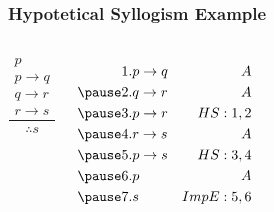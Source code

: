 \documentclass[dvipsnames]{beamer}
\begin{document}
\begin{frame}
  \frametitle{Hypotetical Syllogism Example}

  \begin{example}
    \begin{columns}
      \[
      \frac
        {
          \begin{array}{c}
            p\\
            p \rightarrow q\\
            q \rightarrow r\\
            r \rightarrow s
          \end{array}
        }
        {
          \therefore s
        }
      \]

      \pause
      \begin{eqnarray*}
        1. & p \rightarrow q & A\\
        \pause
        2. & q \rightarrow r & A\\
        \pause
        3. & p \rightarrow r & HS:1,2\\
        \pause
        4. & r \rightarrow s & A\\
        \pause
        5. & p \rightarrow s & HS:3,4\\
        \pause
        6. & p               & A\\
        \pause
        7. & s               & ImpE:5,6
      \end{eqnarray*}
    \end{columns}
  \end{example}
\end{frame}

%
%
\end{document}
